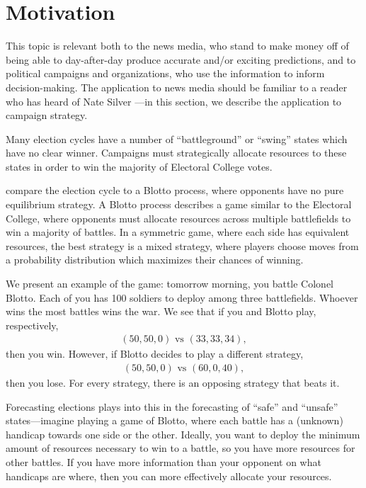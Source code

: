 \documentclass[thesis.tex]{subfiles}
\begin{document}
\section{Motivation}

This topic is relevant both to the news media, who stand to make money off of being able to day-after-day produce accurate and/or exciting predictions, and to political campaigns and organizations, who use the information to inform decision-making. The application to news media should be familiar to a reader who has heard of Nate Silver \citeyearpar{Silver:2012aa}---in this section, we describe the application to campaign strategy.

Many election cycles have a number of ``battleground'' or ``swing'' states which have no clear winner. Campaigns must strategically allocate resources to these states in order to win the majority of Electoral College votes.

\cite{Merolla:2005aa} compare the election cycle to a Blotto process, where opponents have no pure equilibrium strategy. A Blotto process describes a game similar to the Electoral College, where opponents must allocate resources across multiple battlefields to win a majority of battles. In a symmetric game, where each side has equivalent resources, the best strategy is a mixed strategy, where players choose moves from a probability distribution which maximizes their chances of winning.

We present an example of the game: tomorrow morning, you battle Colonel Blotto. Each of you has 100 soldiers to deploy among three battlefields. Whoever wins the most battles wins the war. We see that if you and Blotto play, respectively, \begin{equation*}\begin{aligned}
	(50, 50, 0) \text{ vs } (33, 33, 34),
\end{aligned}\end{equation*} then you win. However, if Blotto decides to play a different strategy, \begin{equation*}\begin{aligned}
	(50, 50, 0) \text{ vs } (60, 0, 40),
\end{aligned}\end{equation*} then you lose. For every strategy, there is an opposing strategy that beats it.

Forecasting elections plays into this in the forecasting of ``safe'' and ``unsafe'' states---imagine playing a game of Blotto, where each battle has a (unknown) handicap towards one side or the other. Ideally, you want to deploy the minimum amount of resources necessary to win to a battle, so you have more resources for other battles. If you have more information than your opponent on what handicaps are where, then you can more effectively allocate your resources.
\end{document}
